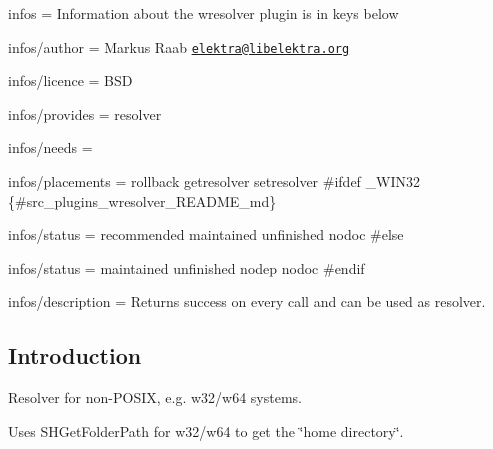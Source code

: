 
\begin{DoxyItemize}
\item infos = Information about the wresolver plugin is in keys below
\item infos/author = Markus Raab \href{mailto:elektra@libelektra.org}{\tt elektra@libelektra.\+org}
\item infos/licence = B\+S\+D
\item infos/provides = resolver
\item infos/needs =
\item infos/placements = rollback getresolver setresolver \#ifdef \+\_\+\+W\+I\+N32 \{\#src\+\_\+plugins\+\_\+wresolver\+\_\+\+R\+E\+A\+D\+M\+E\+\_\+md\}
\item infos/status = recommended maintained unfinished nodoc \#else
\item infos/status = maintained unfinished nodep nodoc \#endif
\item infos/description = Returns success on every call and can be used as resolver.
\end{DoxyItemize}

\subsection*{Introduction}

Resolver for non-\/\+P\+O\+S\+I\+X, e.\+g. w32/w64 systems.

Uses S\+H\+Get\+Folder\+Path for w32/w64 to get the \char`\"{}home directory\char`\"{}. 
